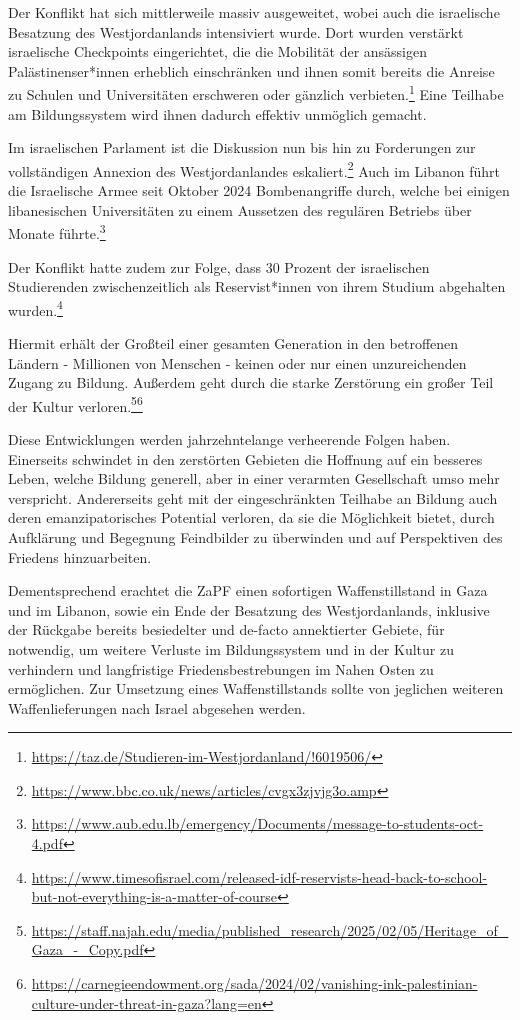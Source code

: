\documentclass[DIV=calc]{scrartcl}
\begin{document}
Der Konflikt hat sich mittlerweile massiv ausgeweitet, wobei auch die israelische Besatzung des Westjordanlands intensiviert wurde. Dort wurden verstärkt israelische Checkpoints eingerichtet, die die Mobilität der ansässigen Palästinenser*innen erheblich einschränken und ihnen somit bereits die Anreise zu Schulen und Universitäten erschweren oder gänzlich verbieten.\footnote{\label{note4}\url{https://taz.de/Studieren-im-Westjordanland/!6019506/}} Eine Teilhabe am Bildungssystem wird ihnen dadurch effektiv unmöglich gemacht.

Im israelischen Parlament ist die Diskussion nun bis hin zu Forderungen zur vollständigen Annexion des Westjordanlandes
eskaliert.\footnote{\label{note5}\url{https://www.bbc.co.uk/news/articles/cvgx3zjvjg3o.amp}} Auch im Libanon führt die Israelische Armee seit Oktober 2024 Bombenangriffe durch, welche bei einigen libanesischen Universitäten zu einem Aussetzen des regulären Betriebs über Monate führte.\footnote{\label{note6}\url{https://www.aub.edu.lb/emergency/Documents/message-to-students-oct-4.pdf}}

\newpage 
Der Konflikt hatte zudem zur Folge, dass 30 Prozent der israelischen Studierenden zwischenzeitlich als Reservist*innen von ihrem Studium abgehalten wurden.\footnote{\label{note7}\url{https://www.timesofisrael.com/released-idf-reservists-head-back-to-school-but-not-everything-is-a-matter-of-course}}

Hiermit erhält der Großteil einer gesamten Generation in den betroffenen Ländern - Millionen von Menschen - keinen oder nur einen unzureichenden Zugang zu Bildung. Außerdem geht durch die starke Zerstörung ein großer Teil der Kultur verloren.\footnote{\label{note8}\url{https://staff.najah.edu/media/published_research/2025/02/05/Heritage_of_Gaza_-_Copy.pdf}}\footnote{\label{note9}\url{https://carnegieendowment.org/sada/2024/02/vanishing-ink-palestinian-culture-under-threat-in-gaza?lang=en}}

Diese Entwicklungen werden jahrzehntelange verheerende Folgen haben. Einerseits schwindet in den zerstörten Gebieten die Hoffnung auf ein besseres Leben, welche Bildung generell, aber in einer verarmten Gesellschaft umso mehr verspricht.
Andererseits geht mit der eingeschränkten Teilhabe an Bildung auch deren emanzipatorisches Potential verloren, da sie die Möglichkeit bietet, durch Aufklärung und Begegnung Feindbilder zu überwinden und auf Perspektiven des Friedens hinzuarbeiten.

Dementsprechend erachtet die ZaPF einen sofortigen Waffenstillstand in Gaza und im Libanon, sowie ein Ende der Besatzung des Westjordanlands, inklusive der Rückgabe bereits besiedelter und de-facto annektierter Gebiete, für notwendig, um weitere Verluste im Bildungssystem und in der Kultur zu verhindern und langfristige Friedensbestrebungen im Nahen Osten zu ermöglichen. Zur Umsetzung eines Waffenstillstands sollte von jeglichen weiteren Waffenlieferungen nach Israel abgesehen werden.
\end{document}
